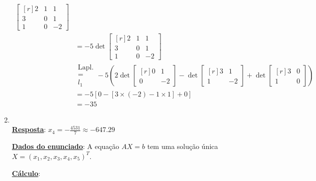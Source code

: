 \begin{enumerate}[label=\alph*.]
\begin{align*}
\begin{bmatrix*}[r]
				2 & 1 & 1\\
				3 & 0 & 1\\
				1 & 0 & -2
			\end{bmatrix*}\\
			&=
			- 5
			\det
			\begin{bmatrix*}[r]
				2 & 1 & 1\\
				3 & 0 & 1\\
				1 & 0 & -2
			\end{bmatrix*}\\
			&
			\begin{matrix}
				\text{Lapl.}\\
				=\\
				l_1
			\end{matrix}
			- 5\left(
			2
			\det
			\begin{bmatrix*}[r]
				0 & 1\\
				0 & -2
			\end{bmatrix*}
			-
			\det
			\begin{bmatrix*}[r]
				3 & 1\\
				1 & -2
			\end{bmatrix*}
			+
			\det
			\begin{bmatrix*}[r]
				3 & 0\\
				1 & 0
			\end{bmatrix*}\right)\\
			&=
			-5[0 -[3 \times (-2) - 1 \times 1] + 0]\\
			&= -35
		\end{align*}
	\clearpage
	\item \;\\
		\textbf{\underline{Resposta}}: $x_4 = -\frac{4531}{7}\approx -647.29$

		\textbf{\underline{Dados do enunciado}}: A equação $AX=b$ tem uma
		solução única $X = (x_1, x_2, x_3, x_4, x_5)^T$.

		\textbf{\underline{Cálculo}}:


\end{enumerate}
